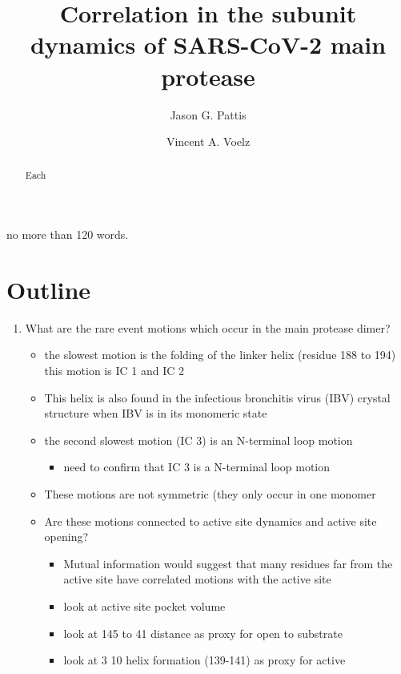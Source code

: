 \documentclass{biophys-new}
\title{Correlation in the subunit dynamics of SARS-CoV-2 main protease}
\author[1,]{Jason G. Pattis}
\author[1,*]{Vincent A. Voelz}
\affil[1]{Temple University, Philadelphia, Pennsylvania 19122, USA}
\begin{document}
\begin{frontmatter}

\begin{abstract}
Each 
\end{abstract}

\begin{sigstatement}
no more than 120 words.
\end{sigstatement}
\end{frontmatter}

\section*{Outline}

\begin{enumerate}
    \item What are the rare event motions which occur in the main protease dimer?
    \begin{itemize}
        \item the slowest motion is the folding of the linker helix (residue 188 to 194) this motion is IC 1 and IC 2
        \item This helix is also found in the infectious bronchitis virus (IBV) crystal structure when IBV is in its monomeric state
        \item the second slowest motion (IC 3) is an N-terminal loop motion
        \begin{itemize}
            \color{blue}
            \item need to confirm that IC 3 is a N-terminal loop motion
        \end{itemize}
        \item These motions are not symmetric (they only occur in one monomer 
        \item Are these motions connected to active site dynamics and active site opening?
        \begin{itemize}
            \item Mutual information would suggest that many residues far from the active site have correlated motions with the active site
            \color{blue}
            \item look at active site pocket volume
            \item look at 145 to 41 distance as proxy for open to substrate
            \item look at 3 10 helix formation (139-141) as proxy for active
        \end{itemize}
    

\end{itemize}
\end{enumerate}
\end{document}
